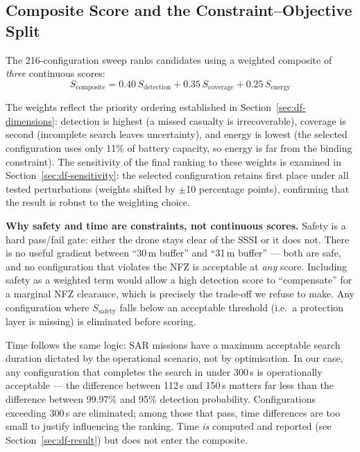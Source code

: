 \documentclass[10pt,a4paper]{article}
\begin{document}
\subsection{Composite Score and the Constraint--Objective Split}\label{sec:score-composite}

The 216-configuration sweep ranks candidates using a weighted composite of \emph{three} continuous scores:
\begin{equation}\label{eq:composite}
  S_\text{composite} = 0.40\,S_\text{detection} + 0.35\,S_\text{coverage} + 0.25\,S_\text{energy}
\end{equation}

The weights reflect the priority ordering established in Section~\ref{sec:df-dimensions}: detection is highest (a missed casualty is irrecoverable), coverage is second (incomplete search leaves uncertainty), and energy is lowest (the selected configuration uses only 11\% of battery capacity, so energy is far from the binding constraint). The sensitivity of the final ranking to these weights is examined in Section~\ref{sec:df-sensitivity}: the selected configuration retains first place under all tested perturbations (weights shifted by $\pm$10 percentage points), confirming that the result is robust to the weighting choice.

\textbf{Why safety and time are constraints, not continuous scores.} Safety is a hard pass/fail gate: either the drone stays clear of the SSSI or it does not. There is no useful gradient between ``30\,m buffer'' and ``31\,m buffer'' --- both are safe, and no configuration that violates the NFZ is acceptable at \emph{any} score. Including safety as a weighted term would allow a high detection score to ``compensate'' for a marginal NFZ clearance, which is precisely the trade-off we refuse to make. Any configuration where $S_\text{safety}$ falls below an acceptable threshold (i.e.\ a protection layer is missing) is eliminated before scoring.

Time follows the same logic: SAR missions have a maximum acceptable search duration dictated by the operational scenario, not by optimisation. In our case, any configuration that completes the search in under 300\,s is operationally acceptable --- the difference between 112\,s and 150\,s matters far less than the difference between 99.97\% and 95\% detection probability. Configurations exceeding 300\,s are eliminated; among those that pass, time differences are too small to justify influencing the ranking. Time \emph{is} computed and reported (see Section~\ref{sec:df-result}) but does not enter the composite.
\end{document}
